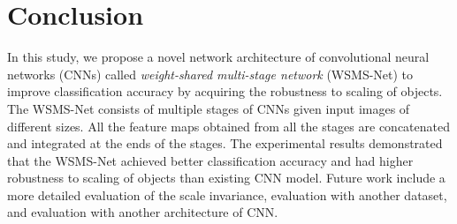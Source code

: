 \documentclass[journal]{IEEEtran}
\begin{document}
\section{Conclusion}

In this study, we propose a novel network architecture of convolutional neural networks (CNNs) called \emph{weight-shared multi-stage network} (WSMS-Net) to improve classification accuracy by acquiring the robustness to scaling of objects.
The WSMS-Net consists of multiple stages of CNNs given input images of different sizes.
All the feature maps obtained from all the stages are concatenated and integrated at the ends of the stages.
The experimental results demonstrated that the WSMS-Net achieved better classification accuracy and had higher robustness to scaling of objects than existing CNN model.
Future work include a more detailed evaluation of the scale invariance, evaluation with another dataset, and evaluation with another architecture of CNN.




% 
% 
\end{document}
